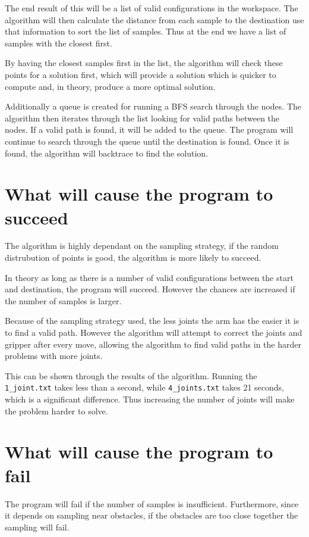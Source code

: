 \documentclass[12pt]{article}
\begin{document}
    The end result of this will be a list of valid configurations in the workspace.
    The algorithm will then calculate the distance from each sample to the destination use that information to sort the list of samples. Thus at the end we have a list of samples with the closest first.
    
    By having the closest samples first in the list, the algorithm will check these points for a solution first, which will provide a solution which is quicker to compute and, in theory, produce a more optimal solution.

    Additionally a queue is created for running a BFS search through the nodes. The algorithm then iterates through the list looking for valid paths between the nodes. If a valid path is found, it will be added to the queue.
    The program will continue to search through the queue until the destination is found. Once it is found, the algorithm will backtrace to find the solution. 


    \section{What will cause the program to succeed}

    The algorithm is highly dependant on the sampling strategy, if the random distrubution of points is good, the algorithm is more likely to succeed.

    In theory as long as there is a number of valid configurations between the start and destination, the program will succeed. However the chances are increased if the number of samples is larger.

    Because of the sampling strategy used, the less joints the arm has the easier it is to find a valid path. However the algorithm will attempt to correct the joints and gripper after every move, allowing the algorithm to find valid paths in the harder problems with more joints.

   This can be shown through the results of the algorithm. Running the \texttt{1\_joint.txt} takes less than a second, while \texttt{4\_joints.txt} takes 21 seconds, which is a significant difference. Thus increasing the number of joints will make the problem harder to solve.

    \section{What will cause the program to fail}

    The program will fail if the number of samples is insufficient. Furthermore, since it depends on sampling near obstacles, if the obstacles are too close together the sampling will fail.
\end{document}
